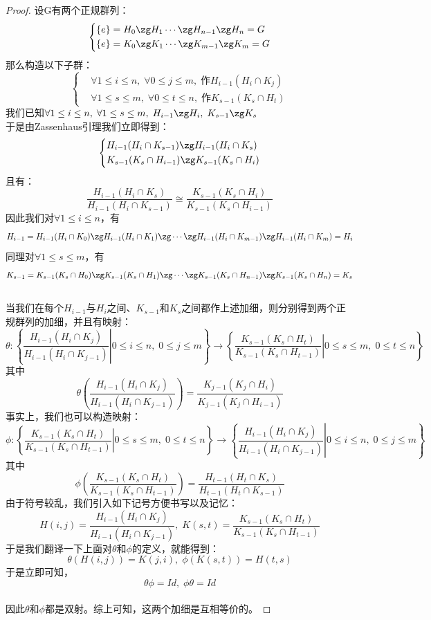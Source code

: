 \begin{proof}
设G有两个正规群列：
\[
\left\{
\begin{aligned}
&\{e\}=H_0\zg H_1\cdots \zg H_{n-1}\zg H_n=G\\
&\{e\}=K_0\zg K_1\cdots \zg K_{m-1}\zg K_m=G
\end{aligned}
\right.
\]
那么构造以下子群：
\[
\left\{
\begin{aligned}
&\forall 1\leq i\leq n,\; \forall 0\leq j\leq m,\; \text{作} H_{i-1}(H_i\cap K_j)\\
&\forall 1\leq s\leq m,\; \forall 0\leq t\leq n,\; \text{作} K_{s-1}(K_s\cap H_t)
\end{aligned}
\right.
\]
我们已知$\forall 1\leq i\leq n,\; \forall 1\leq s\leq m,\; H_{i-1}\zg H_i,\; K_{s-1}\zg K_s$\\
于是由Zassenhaus引理我们立即得到：
\[
\left\{
\begin{aligned}
&H_{i-1}(H_i\cap K_{s-1})\zg H_{i-1}(H_i\cap K_s)\\
&K_{s-1}(K_s\cap H_{i-1})\zg K_{s-1}(K_s\cap H_i)
\end{aligned}
\right.
\]
且有：
\[
\frac{H_{i-1}(H_i\cap K_s)}{H_{i-1}(H_i\cap K_{s-1})}\cong \frac{K_{s-1}(K_s\cap H_i)}{K_{s-1}(K_s\cap H_{i-1})}
\]
因此我们对$\forall 1\leq i\leq n$，有
\[
H_{i-1}=H_{i-1}(H_i\cap K_0)\zg H_{i-1}(H_i\cap K_1)\zg \cdots \zg H_{i-1}(H_i\cap K_{m-1})\zg H_{i-1}(H_i\cap K_m)=H_i
\]
同理对$\forall 1\leq s\leq m$，有
\[
K_{s-1}=K_{s-1}(K_s\cap H_0)\zg K_{s-1}(K_s\cap H_1)\zg \cdots \zg K_{s-1}(K_s\cap H_{n-1})\zg K_{s-1}(K_s\cap H_n)=K_s
\]
\\
当我们在每个$H_{i-1}$与$H_i$之间、$K_{s-1}$和$K_s$之间都作上述加细，则分别得到两个正规群列的加细，并且有映射：
\[
\theta\colon \left\{\left.\frac{H_{i-1}(H_i\cap K_j)}{H_{i-1}(H_i\cap K_{j-1})}\right|0\leq i\leq n,\; 0\leq j\leq m\right\}\to \left\{\left.\frac{K_{s-1}(K_s\cap H_t)}{K_{s-1}(K_s\cap H_{t-1})}\right|0\leq s\leq m,\; 0\leq t\leq n\right\}
\]
其中
\[
\theta\left(\frac{H_{i-1}(H_i\cap K_j)}{H_{i-1}(H_i\cap K_{j-1})}\right)=\frac{K_{j-1}(K_j\cap H_i)}{K_{j-1}(K_j\cap H_{i-1})}
\]
事实上，我们也可以构造映射：
\[
\phi\colon \left\{\left.\frac{K_{s-1}(K_s\cap H_t)}{K_{s-1}(K_s\cap H_{t-1})}\right|0\leq s\leq m,\; 0\leq t\leq n\right\}\to \left\{\left.\frac{H_{i-1}(H_i\cap K_j)}{H_{i-1}(H_i\cap K_{j-1})}\right|0\leq i\leq n,\; 0\leq j\leq m\right\}
\]
其中
\[
\phi\left(\frac{K_{s-1}(K_s\cap H_t)}{K_{s-1}(K_s\cap H_{t-1})}\right)=\frac{H_{t-1}(H_t\cap K_s)}{H_{t-1}(H_t\cap K_{s-1})}
\]
由于符号较乱，我们引入如下记号方便书写以及记忆：
\[
H(i,j)=\frac{H_{i-1}(H_i\cap K_j)}{H_{i-1}(H_i\cap K_{j-1})},\; K(s,t)=\frac{K_{s-1}(K_s\cap H_t)}{K_{s-1}(K_s\cap H_{t-1})}
\]
于是我们翻译一下上面对$\theta$和$\phi$的定义，就能得到：
\[
\theta(H(i,j))=K(j,i),\; \phi(K(s,t))=H(t,s)
\]
于是立即可知，
\[
\theta\phi=Id,\; \phi\theta=Id
\]
\\
因此$\theta$和$\phi$都是双射。综上可知，这两个加细是互相等价的。
\end{proof}
